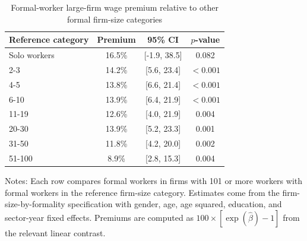 \begin{table}[htbp]
  \centering
  \caption{Formal-worker large-firm wage premium relative to other formal firm-size categories}
  \label{tab:formal-101-contrasts}
  \small
  \begin{tabular}{lccc}
    \toprule
    Reference category & Premium & 95\% CI & $p$-value \\
    \midrule
    Solo workers & 16.5\% & [-1.9, 38.5] & 0.082 \\
    2-3 & 14.2\% & [5.6, 23.4] & $<0.001$ \\
    4-5 & 13.8\% & [6.6, 21.4] & $<0.001$ \\
    6-10 & 13.9\% & [6.4, 21.9] & $<0.001$ \\
    11-19 & 12.6\% & [4.0, 21.9] & 0.004 \\
    20-30 & 13.9\% & [5.2, 23.3] & 0.001 \\
    31-50 & 11.8\% & [4.2, 20.0] & 0.002 \\
    51-100 & 8.9\% & [2.8, 15.3] & 0.004 \\
    \bottomrule
  \end{tabular}
  \vspace{0.3em}
  \begin{minipage}{0.92\textwidth}
  \footnotesize
  Notes: Each row compares formal workers in firms with 101 or more workers with formal workers in the reference firm-size category. Estimates come from the firm-size-by-formality specification with gender, age, age squared, education, and sector-year fixed effects. Premiums are computed as $100\times[\exp(\hat{\beta})-1]$ from the relevant linear contrast.
  \end{minipage}
\end{table}
